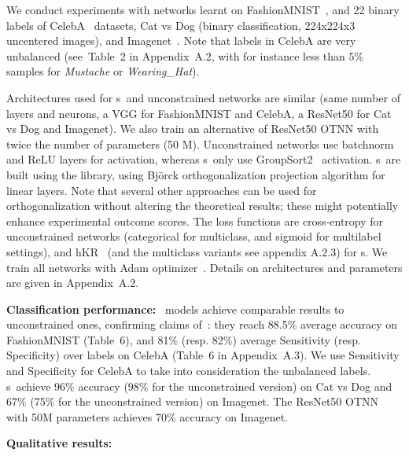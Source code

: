 We conduct experiments with networks learnt on FashionMNIST~\cite{Xiao2017FashionMNIST}, and 22 binary labels of CelebA~\cite{liu2015faceattributes} datasets, Cat vs Dog (binary classification, 224x224x3 uncentered images),  and Imagenet~\cite{imagenet}. Note that labels in CelebA are very unbalanced (see~Table~2 in Appendix~A.2, with for instance less than $5\%$ samples for \textit{Mustache} or \textit{Wearing\_Hat}).%

Architectures used for \otnn s~and unconstrained networks are similar (same number of layers and neurons, a VGG for FashionMNIST and CelebA, a ResNet50 for Cat vs Dog and Imagenet). We also train an alternative of ResNet50 OTNN with twice the number of parameters (50 M).  Unconstrained networks use batchnorm and ReLU layers for activation, whereas \otnn s~only use GroupSort2~\cite{pmlr-v97-anil19a,serrurier2021achieving} activation. \otnn s~are built using the \Deellip library, using Björck orthogonalization projection algorithm for linear layers. Note that several other approaches can be used for orthogonalization without altering the theoretical results; these might potentially enhance experimental outcome scores.
The loss functions are cross-entropy for unconstrained networks (categorical for multiclass, and sigmoid for multilabel settings), and hKR \losshkr~(and the multiclass variants see appendix A.2.3) for \otnn s. We train all networks with Adam optimizer~\cite{Diederik14Adam}. Details on architectures and parameters are given in Appendix~A.2.


\textbf{Classification performance:} \otnn~models achieve comparable results to  unconstrained ones, confirming claims of~\cite{bethunelip}: they reach 88.5\%
average accuracy on FashionMNIST
(Table~6), and 81\% (resp. 82\%) average Sensitivity (resp. Specificity) over labels on CelebA (Table~6 in Appendix~A.3). We use  Sensitivity and Specificity for CelebA to take into consideration the unbalanced labels. \otnn s~achieve 96\%  accuracy (98\% for the unconstrained version) on Cat vs Dog and 67\% (75\% for the unconstrained version) on Imagenet. The ResNet50 OTNN with 50M parameters achieves 70\% accuracy on Imagenet. 




\textbf{Qualitative results: }
